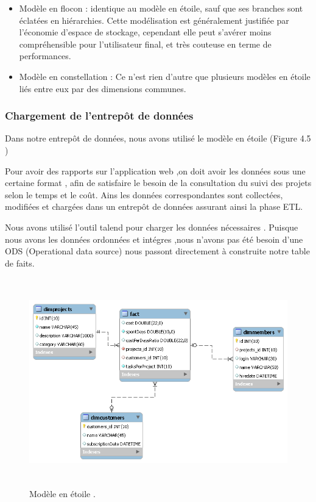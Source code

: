 \begin{itemize}
  \item {Mod\`{e}le en flocon : identique au mod\`{e}le en \'{e}toile, sauf que ses branches sont \'{e}clat\'{e}es en hi\'{e}rarchies. Cette mod\'{e}lisation est g\'{e}n\'{e}ralement justifi\'{e}e par l'\'{e}conomie
d'espace de stockage, cependant elle peut s'av\'{e}rer moins compr\'{e}hensible pour l'utilisateur
final, et tr\`{e}s couteuse en terme de performances.}
  \item {Mod\`{e}le en constellation : Ce n'est rien d'autre que plusieurs mod\`{e}les en \'{e}toile
li\'{e}s entre eux par des dimensions communes. }
\end{itemize}




\subsubsection{Chargement de l'entrepôt  de donn\'{e}es}

Dans notre entrep\^{o}t de donn\'{e}es, nous avons utilis\'{e} le mod\`{e}le en \'{e}toile (Figure 4.5 )

Pour avoir des rapports sur l'application web ,on doit avoir les donn\'{e}es sous une certaine format ,
afin de satisfaire le besoin de la consultation du suivi des projets selon le temps et le co\^{u}t.
Ains les donn\'{e}es correspondantes sont collect\'{e}es, modifi\'{e}es et charg\'{e}es dans un entrep\^{o}t de donn\'{e}es
assurant ainsi la phase ETL.

Nous avons utilis\'{e} l'outil talend pour charger les donn\'{e}es n\'{e}cessaires .
Puisque nous avons les donn\'{e}es ordonn\'{e}es et int\'{e}gres ,nous n'avons pas \'{e}t\'{e} besoin d'une ODS (Operational data source)
nous passont directement \`{a} construite notre table de faits.


\begin{figure}[H]
\center
\includegraphics[width=14cm,height=9cm]{./figures/etoile.png}
\caption{ Mod\`{e}le en \'{e}toile .}
\end{figure}



